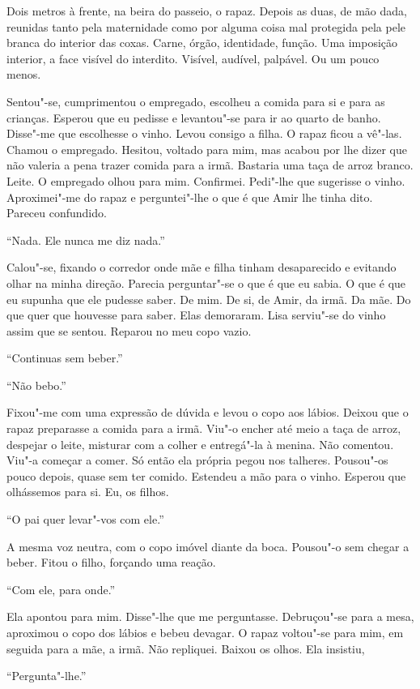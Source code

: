 Dois metros à frente, na beira do passeio, o rapaz. Depois as duas, de
mão dada, reunidas tanto pela maternidade como por alguma coisa mal
protegida pela pele branca do interior das coxas. Carne, órgão,
identidade, função. Uma imposição interior, a face visível do interdito.
Visível, audível, palpável. Ou um pouco menos.

Sentou"-se, cumprimentou o empregado, escolheu a comida para si e para
as crianças. Esperou que eu pedisse e levantou"-se para ir ao quarto de
banho. Disse"-me que escolhesse o vinho. Levou consigo a filha. O rapaz
ficou a vê"-las. Chamou o empregado. Hesitou, voltado para mim, mas
acabou por lhe dizer que não valeria a pena trazer comida para a irmã.
Bastaria uma taça de arroz branco. Leite. O empregado olhou para mim.
Confirmei. Pedi"-lhe que sugerisse o vinho. Aproximei"-me do rapaz e
perguntei"-lhe o que é que Amir lhe tinha dito. Pareceu confundido.

``Nada. Ele nunca me diz nada.''

Calou"-se, fixando o corredor onde mãe e filha tinham desaparecido e
evitando olhar na minha direção. Parecia perguntar"-se o que é que eu
sabia. O que é que eu supunha que ele pudesse saber. De mim. De si, de
Amir, da irmã. Da mãe. Do que quer que houvesse para saber. Elas
demoraram. Lisa serviu"-se do vinho assim que se sentou. Reparou no meu
copo vazio.

``Continuas sem beber.''

``Não bebo.''

Fixou"-me com uma expressão de dúvida e levou o copo aos lábios. Deixou
que o rapaz preparasse a comida para a irmã. Viu"-o encher até meio a
taça de arroz, despejar o leite, misturar com a colher e entregá"-la à
menina. Não comentou. Viu"-a começar a comer. Só então ela própria pegou
nos talheres. Pousou"-os pouco depois, quase sem ter comido. Estendeu a
mão para o vinho. Esperou que olhássemos para si. Eu, os filhos.

``O pai quer levar"-vos com ele.''

A mesma voz neutra, com o copo imóvel diante da boca. Pousou"-o sem
chegar a beber. Fitou o filho, forçando uma reação.

``Com ele, para onde.''

Ela apontou para mim. Disse"-lhe que me perguntasse. Debruçou"-se para a
mesa, aproximou o copo dos lábios e bebeu devagar. O rapaz voltou"-se
para mim, em seguida para a mãe, a irmã. Não repliquei. Baixou os olhos.
Ela insistiu,

``Pergunta"-lhe.''

